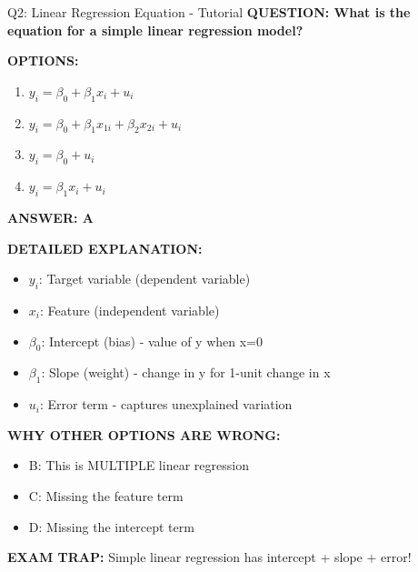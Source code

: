 \documentclass[8pt]{beamer}
\begin{document}
	\begin{frame}{Q2: Linear Regression Equation - Tutorial}
	\fontsize{6.5}{7.5}\selectfont
	\textbf{QUESTION: What is the equation for a simple linear regression model?}
	
	\vspace{0.1cm}
	\textbf{OPTIONS:}
	\begin{enumerate}
		\item $y_i = \beta_0 + \beta_1 x_i + u_i$
		\item $y_i = \beta_0 + \beta_1 x_{1i} + \beta_2 x_{2i} + u_i$
		\item $y_i = \beta_0 + u_i$
		\item $y_i = \beta_1 x_i + u_i$
	\end{enumerate}
	
	\vspace{0.1cm}
	\textcolor{myblue}{\textbf{ANSWER: A}}
	
	\vspace{0.1cm}
	\textbf{DETAILED EXPLANATION:}
	\begin{itemize}
		\item $y_i$: Target variable (dependent variable)
		\item $x_i$: Feature (independent variable)
		\item $\beta_0$: Intercept (bias) - value of y when x=0
		\item $\beta_1$: Slope (weight) - change in y for 1-unit change in x
		\item $u_i$: Error term - captures unexplained variation
	\end{itemize}
	
	\vspace{0.1cm}
	\textcolor{myred}{\textbf{WHY OTHER OPTIONS ARE WRONG:}}
	\begin{itemize}
		\item \textcolor{myred}{B:} This is MULTIPLE linear regression
		\item \textcolor{myred}{C:} Missing the feature term
		\item \textcolor{myred}{D:} Missing the intercept term
	\end{itemize}
	
	\textcolor{myred}{\textbf{EXAM TRAP:}} Simple linear regression has \textcolor{myblue}{intercept + slope + error}!
\end{frame}
\end{document}
